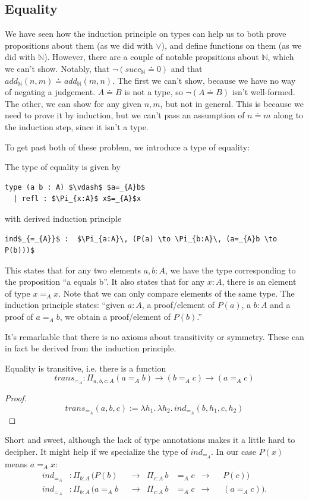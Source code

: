 \documentclass[a4paper, 12pt]{article}
\newcommand{\N}{\mathbb{N}}
\newcommand{\la}[1]{\lambda{#1}.\,}
\theoremstyle{changedot}
\theoremstyle{changedotbreak}
\theoremstyle{nonumberplain}
\newtheorem{proof}{Proof}
\begin{document}
\subsection{Equality}
We have seen how the induction principle on types can help us to both prove propositions about them (as we did with $\lor$), and define functions on them (as we did with $\N$). However, there are a couple of notable propsitions about $\N$, which we can't show. Notably, that $\neg(succ_{\N} \doteq 0)$ and that $add_{\N}(n, m) \doteq add_{\N}(m, n)$. The first we can't show, because we have no way of negating a judgement. $A \doteq B$ is not a type, so $\neg (A \doteq B)$ isn't well-formed. The other, we can show for any given $n, m$, but not in general. This is because we need to prove it by induction, but we can't pass an assumption of $n\doteq m$ along to the induction step, since it isn't a type.

To get past both of these problem, we introduce a type of equality:
\begin{definition}
  The type of equality is given by
\begin{lstlisting}[mathescape=true]
  type (a b : A) $\vdash$ $a=_{A}b$
  | refl : $\Pi_{x:A}$ x$=_{A}$x
\end{lstlisting}
  with derived induction principle  
\begin{lstlisting}
ind$_{=_{A}}$ :  $\Pi_{a:A}\, (P(a) \to \Pi_{b:A}\, (a=_{A}b \to P(b)))$
\end{lstlisting}
\end{definition}

This states that for any two elements $a, b : A$, we have the type corresponding to the proposition ``a equals b''. It also states that for any $x : A$, there is an element of type $x=_{A}x$. Note that we can only compare elements of the same type. The induction principle states: ``given $a:A$, a proof/element of $P(a)$, a $b:A$ and a proof of $a=_{A}b$, we obtain a proof/element of $P(b)$.''

It's remarkable that there is no axioms about transitivity or symmetry. These can in fact be derived from the induction principle.
\begin{theorem}
  Equality is transitive, i.e. there is a function
  \[trans_{=_{A}} : \Pi_{a, b, c : A} (a=_{A}b) \to (b=_{A}c) \to (a=_{A}c) \]
\end{theorem}
\begin{proof}
  \[trans_{=_{A}}(a, b, c) := \la{h_{1}} \la{h_{2}} ind_{=_{A}}(b, h_{1}, c, h_{2})\]
\end{proof}
Short and sweet, although the lack of type annotations makes it a little hard to decipher. It might help if we specialize the type of $ind_{=_{A}}$. In our case $P(x)$ means $a=_{A}x$:
\begin{align*}
  ind_{=_{A}} &: \Pi_{b:A}\, (P(b)& &\to& \Pi_{c:A}\, b&=_{A}c &\to& &P(c)) \\
  ind_{=_{A}} &: \Pi_{b:A}\, (a=_{A}b& &\to& \Pi_{c:A}\, b&=_{A}c &\to& &(a=_{A}c)).
\end{align*}
\end{document}
